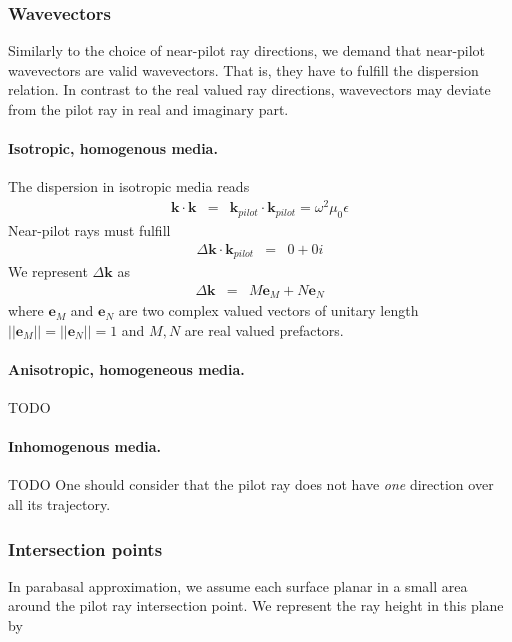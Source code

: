 \documentclass[12pt,a4paper,twoside,openright,BCOR10mm,headsepline,titlepage,abstracton,chapterprefix,final]{scrreprt}
\newcommand\Vector[1]{{\mathbf{#1}}}
\newcommand\vacuum{0}
\newcommand\wavenumber{k}
\newcommand\Wavevector{\Vector{\wavenumber}}
\newcommand\vacuumpermeability{\mu_{\vacuum}}
\newcommand\scalarpermittivity{\epsilon}
\begin{document}
\subsubsection{Wavevectors}
Similarly to the choice of near-pilot ray directions, we demand that near-pilot wavevectors are valid wavevectors.
That is, they have to fulfill the dispersion relation. 
In contrast to the real valued ray directions, wavevectors may deviate from the pilot ray in real and imaginary part.

\paragraph{Isotropic, homogenous media.}

The dispersion in isotropic media reads
\begin{eqnarray}
 \Wavevector \cdot \Wavevector &=& \Wavevector_{pilot} \cdot \Wavevector_{pilot} = \omega^2 \vacuumpermeability \scalarpermittivity
\end{eqnarray}
Near-pilot rays must fulfill
\begin{eqnarray}
 \Delta \Wavevector \cdot \Wavevector_{pilot} &=& 0 + 0i
\end{eqnarray}
We represent $\Delta \Wavevector$ as
\begin{eqnarray}
 \Delta \Wavevector &=& M \Vector{e}_M + N \Vector{e}_N
\end{eqnarray}
where $\Vector{e}_M$ and $\Vector{e}_N$ are two complex valued vectors of unitary length
$||\Vector{e}_M||=||\Vector{e}_N||=1$ and $M,N$ are real valued prefactors.

\paragraph{Anisotropic, homogeneous media.}
TODO

\paragraph{Inhomogenous media.}
TODO
One should consider that the pilot ray does not have \emph{one} direction over all its trajectory.

\subsubsection{Intersection points}

In parabasal approximation, we assume each surface planar in a small area around the pilot ray intersection point. 
We represent the ray height in this plane by
\end{document}
